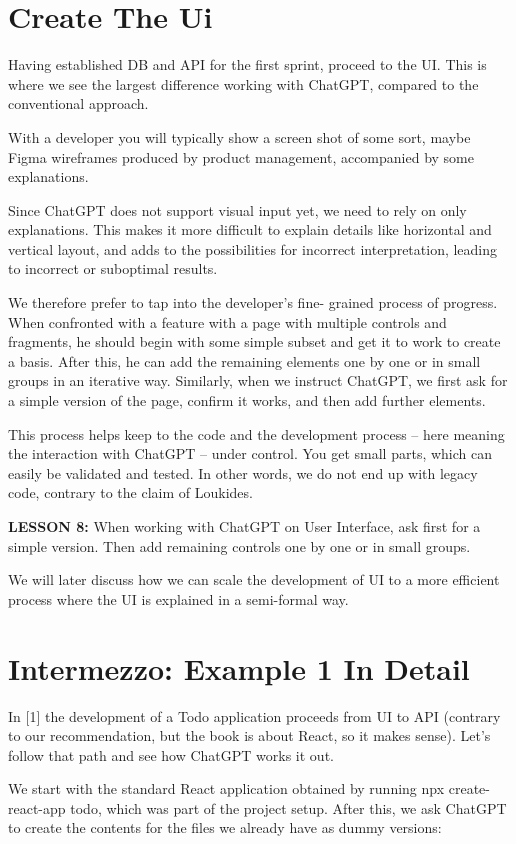 \documentclass[runningheads]{llncs}
\begin{document}
\section{Create The Ui}
Having established DB and API for the first sprint, proceed to the UI. This is where we see the largest difference working with ChatGPT, compared to the conventional approach.

With a developer you will typically show a screen shot of some sort, maybe Figma wireframes produced by product management, accompanied by some explanations.

Since ChatGPT does not support visual input yet, we need to rely on only explanations. This makes it more difficult to explain details like horizontal and vertical layout, and adds to the possibilities for incorrect interpretation, leading to incorrect or suboptimal results.

We therefore prefer to tap into the developer's fine- grained process of progress. When confronted with a feature with a page with multiple controls and fragments, he should begin with some simple subset and get it to work to create a basis. After this, he can add the remaining elements one by one or in small groups in an iterative way.
Similarly, when we instruct ChatGPT, we first ask for a simple version of the page, confirm it works, and then add further elements.

This process helps keep to the code and the development process – here meaning the interaction with ChatGPT – under control. You get small parts, which can easily be validated and tested. In other words, we do not end up with legacy code, contrary to the claim of Loukides\cite{Loukides2023}.

\textbf{LESSON 8:} When working with ChatGPT on User Interface, ask first for a simple version. Then add remaining controls one by one or in small groups.

We will later discuss how we can scale the development of UI to a more efficient process where the UI is explained in a semi-formal way.

\section{Intermezzo: Example 1 In Detail}
In [1] the development of a Todo application proceeds from UI to API (contrary to our recommendation, but the book is about React, so it makes sense). Let's follow that path and see how ChatGPT works it out.

We start with the standard React application obtained by running npx create-react-app todo, which was part of the project setup. After this, we ask ChatGPT to create the contents for the files we already have as dummy versions:
\end{document}
